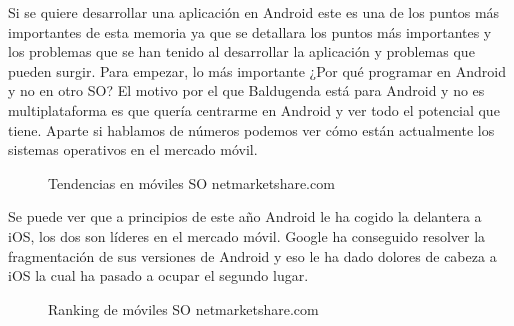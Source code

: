 Si se quiere desarrollar una aplicación en Android este es una de los puntos más importantes de esta memoria ya que se detallara los puntos más importantes y los problemas que se han tenido al desarrollar la aplicación y problemas que pueden surgir.
Para empezar, lo más importante ¿Por qué programar en Android y no en otro SO?
El motivo por el que Baldugenda está para Android  y no es multiplataforma es que quería centrarme en Android y ver todo el potencial que tiene.
Aparte si hablamos de números podemos ver cómo están actualmente los sistemas operativos en el mercado móvil.

\begin{figure}[H] 
  \begin{center} 
    \caption{Tendencias en móviles SO netmarketshare.com} 
    \label{fig:TendenciasSO} 
  \end{center} 
\end{figure}

Se puede ver que a principios de este año Android le ha cogido la delantera a iOS, los dos son líderes en el mercado móvil.
Google ha conseguido resolver la fragmentación de sus versiones de Android y eso le ha dado dolores de cabeza a iOS la cual ha pasado a ocupar el segundo lugar.

\begin{figure}[H] 
  \begin{center} 
    \caption{Ranking de móviles SO netmarketshare.com} 
    \label{fig:RankingSO} 
  \end{center} 
\end{figure}

